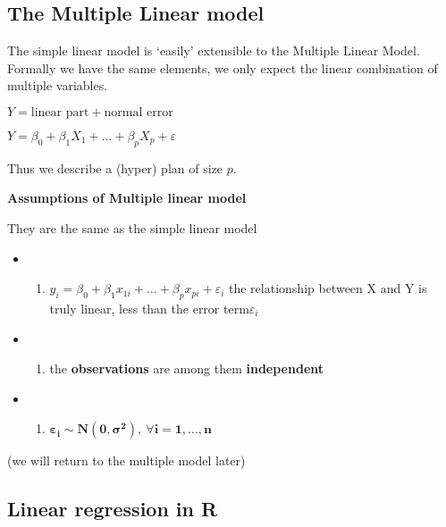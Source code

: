 \documentclass[
]{article}
\providecommand{\tightlist}{%
  \setlength{\itemsep}{0pt}\setlength{\parskip}{0pt}}
\begin{document}
\hypertarget{the-multiple-linear-model}{%
\subsection{The Multiple Linear model}\label{the-multiple-linear-model}}

The simple linear model is `easily' extensible to the Multiple Linear
Model. Formally we have the same elements, we only expect the linear
combination of multiple variables.

\(Y = \textrm {linear part} + \textrm {normal error}\)

\(Y = \beta_0 + \beta_1 X_1 + \ldots + \beta_p X_p + \varepsilon\)

Thus we describe a (hyper) plan of size \(p\).

\textbf{Assumptions of Multiple linear model}

They are the same as the simple linear model

\begin{itemize}
\item
  \begin{enumerate}
  \def\labelenumi{\roman{enumi})}
  \tightlist
  \item
    \(y_i = \beta_0 + \beta_1 x_{1i} + \ldots + \beta_p x_{pi} + \varepsilon_i\)
    the relationship between X and Y is truly linear, less than the
    error term\(\varepsilon_i\)
  \end{enumerate}
\item
  \begin{enumerate}
  \def\labelenumi{\roman{enumi})}
  \setcounter{enumi}{1}
  \tightlist
  \item
    the \textbf{observations} are among them \textbf{independent}
  \end{enumerate}
\item
  \begin{enumerate}
  \def\labelenumi{\roman{enumi})}
  \setcounter{enumi}{2}
  \tightlist
  \item
    \(\boldsymbol {\varepsilon_i \sim N (0, \sigma ^2), \ \forall i = 1, \ldots, n}\)
  \end{enumerate}
\end{itemize}

(we will return to the multiple model later)

\hypertarget{linear-regression-in-r}{%
\subsection{Linear regression in R}\label{linear-regression-in-r}}
\end{document}

